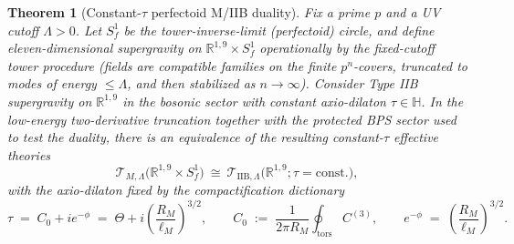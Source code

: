 \documentclass[11pt]{article}
\newtheorem{theorem}{Theorem}[section]
\theoremstyle{remark}
\begin{document}
\begin{theorem}[Constant-$\tau$ perfectoid M/IIB duality]\label{thm:perfectoid_M_IIB_constant_tau}
Fix a prime $p$ and a UV cutoff $\Lambda>0$. Let $S_f^{1}$ be the tower-inverse-limit (perfectoid) circle, and define eleven-dimensional supergravity on $\mathbb{R}^{1,9}\times S_f^{1}$ operationally by the fixed-cutoff tower procedure (fields are compatible families on the finite $p^n$-covers, truncated to modes of energy $\le\Lambda$, and then stabilized as $n\to\infty$). Consider Type IIB supergravity on $\mathbb{R}^{1,9}$ in the bosonic sector with constant axio-dilaton $\tau\in\mathbb{H}$. In the low-energy two-derivative truncation together with the protected BPS sector used to test the duality, there is an equivalence of the resulting constant-$\tau$ effective theories
\begin{equation}\label{eq:thm_duality_correct}
\mathcal{T}_{M,\Lambda}\bigl(\mathbb{R}^{1,9}\times S_f^{1}\bigr)\ \cong\ \mathcal{T}_{\mathrm{IIB},\Lambda}\bigl(\mathbb{R}^{1,9};\tau=\mathrm{const.}\bigr),
\end{equation}
with the axio-dilaton fixed by the compactification dictionary
\begin{equation}\label{eq:tau_main_correct}
\tau \;=\; C_0 + i e^{-\phi}\;=\;\Theta + i\left(\frac{R_M}{\ell_M}\right)^{3/2},
\qquad
C_0 \;:=\; \frac{1}{2\pi R_M}\oint_{\mathrm{tors}} C^{(3)},\qquad
e^{-\phi}\;=\;\left(\frac{R_M}{\ell_M}\right)^{3/2}.
\end{equation}
\end{theorem}
\end{document}
